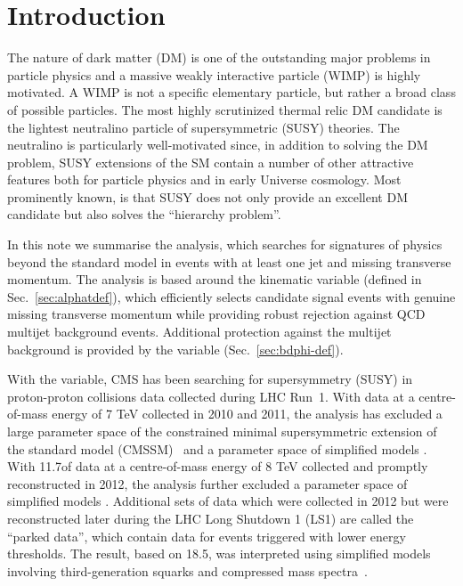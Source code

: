 \section{Introduction}
\label{sec:intro}


The nature of dark matter (DM) is one of the outstanding major
problems in particle physics and a massive weakly interactive particle
(WIMP) is highly motivated. A WIMP is not a specific elementary
particle, but rather a broad class of possible particles. The most
highly scrutinized thermal relic DM candidate is the lightest
neutralino particle of supersymmetric (SUSY) theories. The neutralino
is particularly well-motivated since, in addition to solving the DM
problem, SUSY extensions of the SM contain a number of other
attractive features both for particle physics and in early Universe
cosmology. Most prominently known, is that SUSY does not only provide
an excellent DM candidate but also solves the ``hierarchy problem''.

In this note we summarise the \alphat analysis, which searches for
signatures of physics beyond the standard model in events with at
least one jet and missing transverse momentum. The analysis is based
around the kinematic variable \alphat (defined in
Sec.~\ref{sec:alphatdef}), which efficiently selects candidate signal
events with genuine missing transverse momentum while providing robust
rejection against QCD multijet background events. Additional
protection against the multijet background is provided by the \bdphi
variable (Sec.~\ref{sec:bdphi-def}).

With the \alphat variable, CMS has been searching for supersymmetry
(SUSY) in proton-proton collisions data collected during LHC
Run~1. With data at a centre-of-mass energy of 7 TeV collected in 2010
and 2011, the \alphat analysis has excluded a large parameter space of
the constrained minimal supersymmetric extension of the standard model
(CMSSM)~\cite{Khachatryan:2011tk, Chatrchyan:2011zy,
  Chatrchyan:2012wa} and a parameter space of simplified models
\cite{Chatrchyan:2012wa}. With 11.7\fbinv of data at a centre-of-mass
energy of 8 TeV collected and promptly reconstructed in 2012, the
\alphat analysis further excluded a parameter space of simplified
models \cite{Chatrchyan:2013lya}. Additional sets of data which were
collected in 2012 but were reconstructed later during the LHC Long
Shutdown 1 (LS1) are called the ``parked data'', which contain data
for events triggered with lower energy thresholds. The result, based
on 18.5\fbinv, was interpreted using simplified models involving
third-generation squarks and compressed mass
spectra~\cite{Khachatryan:2016pxa}. 

